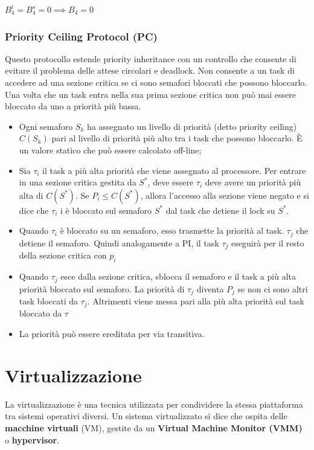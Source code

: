 \documentclass[11pt,a4paper]{report}
\begin{document}
$B_4^l = B_4^s = 0 \implies B_4 = 0$

\subsection{Priority Ceiling Protocol (PC)}

Questo protocollo estende priority inheritance con un controllo che consente di evitare il problema delle attese circolari e deadlock. Non consente a un task di accedere ad una sezione critica se ci sono semafori bloccati che possono bloccarlo. Una volta che un task entra nella sua prima sezione critica non può mai essere bloccato da uno a priorità più bassa.

\begin{itemize}
    \item Ogni semaforo $S_k$ ha assegnato un livello di priorità (detto priority ceiling) $C(S_k)$ pari al livello di priorità più alto tra i task che possono bloccarlo. È un valore statico che può essere calcolato off-line;
    \item Sia $\tau_i$ il task a più alta priorità che viene assegnato al processore. Per entrare in una sezione critica gestita da $S^*$, deve essere $\tau_i$ deve avere un priorità più alta di $C(S^*)$. Se $P_i \leq  C(S^*)$, allora l'accesso alla sezione viene negato e si dice che $\tau_i$ i è bloccato sul semaforo $S^*$ dal task che detiene il lock su $S^*$.
    \item Quando $\tau_i$ è bloccato su un semaforo, esso trasmette la priorità al task. $\tau_j$ che detiene il semaforo. Quindi analogamente a PI, il task $\tau_j$ eseguirà per il resto della sezione critica con $p_i$
    \item Quando $\tau_j$ esce dalla sezione critica, sblocca il semaforo e il task a più alta priorità bloccato sul semaforo. La priorità di $\tau_j$ diventa $P_j$ se non ci sono altri task bloccati da $\tau_j$. Altrimenti viene messa pari alla più alta priorità sul task bloccato da $\tau$
    \item La priorità può essere ereditata per via transitiva.
\end{itemize}


\chapter{Virtualizzazione}

La virtualizzazione è una tecnica utilizzata per condividere la stessa piattaforma tra sistemi operativi diversi. Un sistema virtualizzato si dice che ospita delle \textbf{macchine virtuali} (VM), gestite da un \textbf{Virtual Machine Monitor (VMM)} o \textbf{hypervisor}.
\end{document}
